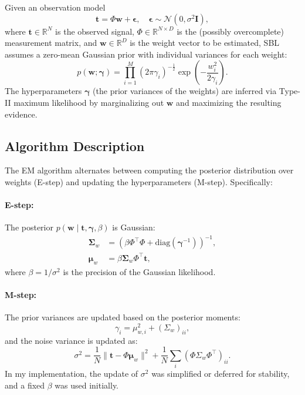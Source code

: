 \documentclass{article}
\begin{document}
Given an observation model
\begin{equation}
    \mathbf{t} = \Phi \mathbf{w} + \boldsymbol{\epsilon}, \quad \boldsymbol{\epsilon} \sim \mathcal{N}(0, \sigma^2 \mathbf{I}),
\end{equation}
where $\mathbf{t} \in \mathbb{R}^N$ is the observed signal, $\Phi \in \mathbb{R}^{N \times D}$ is the (possibly overcomplete) measurement matrix, and $\mathbf{w} \in \mathbb{R}^D$ is the weight vector to be estimated, SBL assumes a zero-mean Gaussian prior with individual variances for each weight:
\begin{equation}
    p(\mathbf{w} ; \boldsymbol{\gamma}) =\prod\limits^M_{i=1}(2\pi\gamma_i)^{-\frac{1}{2}}\exp (-\frac{w_i^2}{2\gamma_i}).
\end{equation}
The hyperparameters $\boldsymbol{\gamma}$ (the prior variances of the weights) are inferred via Type-II maximum likelihood by marginalizing out $\mathbf{w}$ and maximizing the resulting evidence.

\subsection{Algorithm Description}

The EM algorithm alternates between computing the posterior distribution over weights (E-step) and updating the hyperparameters (M-step). Specifically:

\paragraph{E-step:}
The posterior $p(\mathbf{w} \mid \mathbf{t}, \boldsymbol{\gamma}, \beta)$ is Gaussian:
\begin{align}
    \boldsymbol{\Sigma}_w &= \left( \beta \Phi^\top \Phi + \mathrm{diag}(\boldsymbol{\gamma}^{-1}) \right)^{-1}, \\
    \boldsymbol{\mu}_w &= \beta \boldsymbol{\Sigma}_w \Phi^\top \mathbf{t},
\end{align}
where $\beta = 1/\sigma^2$ is the precision of the Gaussian likelihood.

\paragraph{M-step:}
The prior variances are updated based on the posterior moments:
\begin{equation}
    \gamma_i = \mu_{w,i}^2 + (\Sigma_w)_{ii},
\end{equation}
and the noise variance is updated as:
\begin{equation}
    \sigma^2 = \frac{1}{N} \| \mathbf{t} - \Phi \boldsymbol{\mu}_w \|^2 + \frac{1}{N} \sum_i (\Phi \Sigma_w \Phi^\top)_{ii}.
\end{equation}
In my implementation, the update of $\sigma^2$ was simplified or deferred for stability, and a fixed $\beta$ was used initially.
\end{document}
